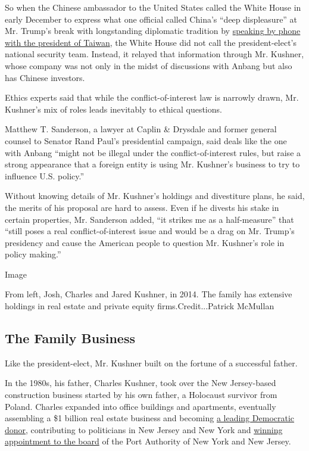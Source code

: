 So when the Chinese ambassador to the United States called the White
House in early December to express what one official called China's
``deep displeasure'' at Mr. Trump's break with longstanding diplomatic
tradition by
\href{https://www.nytimes.com/2016/12/02/us/politics/trump-speaks-with-taiwans-leader-a-possible-affront-to-china.html}{speaking
by phone with the president of Taiwan}, the White House did not call the
president-elect's national security team. Instead, it relayed that
information through Mr. Kushner, whose company was not only in the midst
of discussions with Anbang but also has Chinese investors.

Ethics experts said that while the conflict-of-interest law is narrowly
drawn, Mr. Kushner's mix of roles leads inevitably to ethical questions.

Matthew T. Sanderson, a lawyer at Caplin \& Drysdale and former general
counsel to Senator Rand Paul's presidential campaign, said deals like
the one with Anbang ``might not be illegal under the
conflict-of-interest rules, but raise a strong appearance that a foreign
entity is using Mr. Kushner's business to try to influence U.S.
policy.''

Without knowing details of Mr. Kushner's holdings and divestiture plans,
he said, the merits of his proposal are hard to assess. Even if he
divests his stake in certain properties, Mr. Sanderson added, ``it
strikes me as a half-measure'' that ``still poses a real
conflict-of-interest issue and would be a drag on Mr. Trump's presidency
and cause the American people to question Mr. Kushner's role in policy
making.''

Image

From left, Josh, Charles and Jared Kushner, in 2014. The family has
extensive holdings in real estate and private equity
firms.Credit...Patrick McMullan

\hypertarget{the-family-business}{%
\subsection{The Family Business}\label{the-family-business}}

Like the president-elect, Mr. Kushner built on the fortune of a
successful father.

In the 1980s, his father, Charles Kushner, took over the New
Jersey-based construction business started by his own father, a
Holocaust survivor from Poland. Charles expanded into office buildings
and apartments, eventually assembling a \$1 billion real estate business
and becoming
\href{http://www.nytimes.com/2004/07/15/nyregion/democratic-donor-is-known-for-short-temper-and-big-heart.html}{a
leading Democratic donor}, contributing to politicians in New Jersey and
New York and
\href{http://www.nytimes.com/2003/02/27/nyregion/mcgreevey-s-nominee-to-lead-port-authority-withdraws.html}{winning
appointment to the board} of the Port Authority of New York and New
Jersey.

